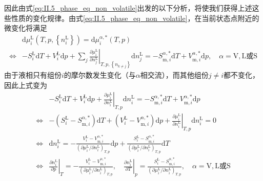 \documentclass[main.tex]{subfiles}
\begin{document}
因此由式\eqref{eq:II.5_phase_eq_non_volatile}出发的以下分析，将使我们获得上述这些性质的变化规律。由式\eqref{eq:II.5_phase_eq_non_volatile}，在当前状态点附近的微变化将满足
\begin{align*}
                  & \mathrm{d}\mu_i^\text{L}\left(T,p,\left\{n_i^\text{L}\right\}\right)=\mathrm{d}\mu_i^{\alpha,*}\left(T,p\right)                                                                                                                                                                             \\
  \Leftrightarrow & -S_i^\text{L}\mathrm{d}T+V_i^\text{L}\mathrm{d}p+\sum_j\left.\frac{\partial \mu_i^\text{L}}{\partial n_j^\text{L}}\right|_{T,p,\left\{n_{k\neq j}\right\}}\mathrm{d}n_j^\text{L}=-S_{\text{m},i}^{\alpha,*}\mathrm{d}T+V_{\text{m},i}^{\alpha,*}\mathrm{d}p,\quad\alpha=\text{V},\text{L或S}
\end{align*}
由于液相只有组份$i$的摩尔数发生变化（与$\alpha$相交流），而其他组份$j\neq i$都不变化，因此上式变为
\begin{align*}
                  & -S_i^\text{L}\mathrm{d}T+V_i^\text{L}\mathrm{d}p+\left.\frac{\partial\mu_i^\text{L}}{\partial n_i^\text{L}}\right|_{T,p}\mathrm{d}n_i^\text{L}=-S_{\text{m},i}^{\alpha,*}\mathrm{d}T+V_{\text{m},i}^{\alpha,*}\mathrm{d}p                                                                                                                                                               \\
  \Leftrightarrow & -\left(S_i^\text{L}-S_{\text{m},i}^{\alpha,*}\right)\mathrm{d}T+\left(V_i^\text{L}-V_{\text{m},i}^{\alpha,*}\right)\mathrm{d}p+\left.\frac{\partial \mu_i^\text{L}}{\partial n_i^\text{L}}\right|_{T,p}\mathrm{d}n_i^\text{L}=0                                                                                                                                                         \\
  \Leftrightarrow & \mathrm{d}n_i^\text{L}=-\frac{V_i^\text{L}-V_{\text{m},i}^{\alpha,*}}{\left(\partial\mu_i^\text{L}/\partial n_i^\text{L}\right)_{T,p}}\mathrm{d}p+\frac{S_i^\text{L}-S_{\text{m},i}^{\alpha,*}}{\left(\partial\mu_i^\text{L}/\partial n_i^\text{L}\right)_{T,p}} \mathrm{d}T                                                                                                            \\
  \Leftrightarrow & \left.\frac{\partial n_i^\text{L}}{\partial p}\right|_{T}=-\frac{V_i^\text{L}-V_{\text{m},i}^{\alpha,*}}{\left(\partial\mu_i^\text{L}/\partial n_i^\text{L}\right)_{T,p}},\quad\left.\frac{\partial n_i^\text{L}}{\partial T}\right|_{p}=\frac{S_i^\text{L}-S_{\text{m},i}^{\alpha,*}}{\left(\partial\mu_i^\text{L}/\partial n_i^\text{L}\right)_{T,p}},\quad\alpha=\text{V},\text{L或S}
\end{align*}
\end{document}
